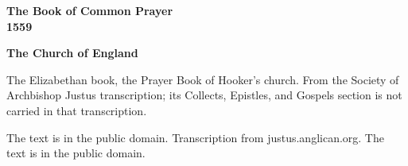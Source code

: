 \documentclass[11pt,letterpaper]{article}
\begin{document}
\color{ink}

\begin{titlepage}
\centering
\vspace*{4em}
{\LARGE\bfseries\color{heading} The Book of Common Prayer\\[0.3em]1559\par}
\vspace{2em}
{\Large\bfseries\color{heading} The Church of England\par}
\vspace{2.5em}
{\itshape\color{subhead}\parbox{0.8\linewidth}{\centering The Elizabethan book, the Prayer Book of Hooker's church. From the Society of Archbishop Justus transcription; its Collects, Epistles, and Gospels section is not carried in that transcription.\par}}
\vfill
{\small The text is in the public domain. Transcription from justus.anglican.org. The text is in the public domain.\par}
\vspace{2em}
\end{titlepage}

\tableofcontents


\end{document}
